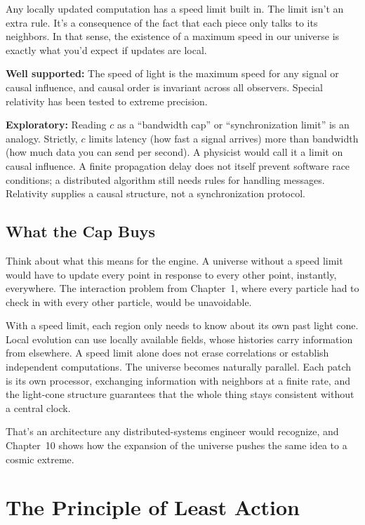 Any locally updated computation has a speed limit built in. The limit isn't an extra rule. It's a consequence of the fact that each piece only talks to its neighbors. In that sense, the existence of a maximum speed in our universe is exactly what you'd expect if updates are local.

\begin{researchnotebox}
\textbf{Well supported:} The speed of light is the maximum speed for any signal or causal influence, and causal order is invariant across all observers. Special relativity has been tested to extreme precision.

\textbf{Exploratory:} Reading \(c\) as a ``bandwidth cap'' or ``synchronization limit'' is an analogy. Strictly, \(c\) limits latency (how fast a signal arrives) more than bandwidth (how much data you can send per second). A physicist would call it a limit on causal influence. A finite propagation delay does not itself prevent software race conditions; a distributed algorithm still needs rules for handling messages. Relativity supplies a causal structure, not a synchronization protocol.
\end{researchnotebox}

\subsection{What the Cap Buys}

Think about what this means for the engine. A universe without a speed limit would have to update every point in response to every other point, instantly, everywhere. The interaction problem from Chapter~1, where every particle had to check in with every other particle, would be unavoidable.

With a speed limit, each region only needs to know about its own past light cone. Local evolution can use locally available fields, whose histories carry information from elsewhere. A speed limit alone does not erase correlations or establish independent computations. The universe becomes naturally parallel. Each patch is its own processor, exchanging information with neighbors at a finite rate, and the light-cone structure guarantees that the whole thing stays consistent without a central clock.

That's an architecture any distributed-systems engineer would recognize, and Chapter~10 shows how the expansion of the universe pushes the same idea to a cosmic extreme.

\section{The Principle of Least Action}

